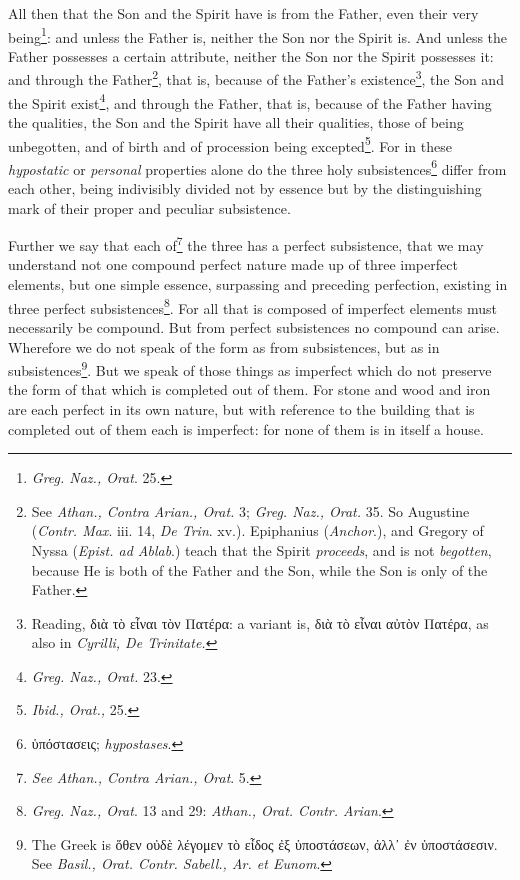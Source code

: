 All then that the Son and the Spirit have is from the Father, even their very being\footnote{\emph{Greg. Naz., Orat}. 25.}: and unless the Father is, neither the Son nor the Spirit is. And unless the Father possesses a certain attribute, neither the Son nor the Spirit possesses it: and through the Father\footnote{See \emph{Athan., Contra Arian., Orat. }3; \emph{Greg. Naz., Orat. }35. So Augustine (\emph{Contr. Max}. iii. 14, \emph{De Trin}. xv.). Epiphanius (\emph{Anchor}.), and Gregory of Nyssa (\emph{Epist. ad Ablab}.) teach that the Spirit \emph{proceeds}, and is not \emph{begotten}, because He is both of the Father and the Son, while the Son is only of the Father.}, that is, because of the Father’s existence\footnote{Reading, \textgreek{διὰ τὸ εἶναι τὸν Πατέρα}: a variant is, \textgreek{διὰ τὸ εἶναι αὐτὸν Πατέρα}, as also in \emph{Cyrilli, De Trinitate.}}, the Son and the Spirit exist\footnote{\emph{Greg. Naz., Orat. }23.}, and through the Father, that is, because of the Father having the qualities, the Son and the Spirit have all their qualities, those of being unbegotten, and of birth and of procession being excepted\footnote{\emph{Ibid., Orat.,} 25.}. For in these \emph{hypo}\emph{static} or \emph{personal }properties alone do the three holy subsistences\footnote{\textgreek{ὑπόστασεις}; \emph{hypostases}.} differ from each other, being indivisibly divided not by essence but by the distinguishing mark of their proper and peculiar subsistence.

Further we say that each of\footnote{\emph{See Athan., Contra Arian., Orat}. 5.} the three has a perfect subsistence, that we may understand not one compound perfect nature made up of three imperfect elements, but one simple essence, surpassing and preceding perfection, existing in three perfect subsistences\footnote{\emph{Greg. Naz., Orat}. 13 and 29: \emph{Athan., Orat. Contr. Arian}.}. For all that is composed of imperfect elements must necessarily be compound. But from perfect subsistences no compound can arise. Wherefore we do not speak of the form as from subsistences, but as in subsistences\footnote{The Greek is \textgreek{ὅθεν οὐδὲ λέγομεν τὸ εἶδος ἐξ ὑποστάσεων, ἀλλ᾽ ἐν ὑποστάσεσιν}. See \emph{Basil., Orat. Contr. Sabell., Ar. et Eunom}.}. But we speak of those things as imperfect which do not preserve the form of that which is completed out of them. For stone and wood and iron are each perfect in its own nature, but with reference to the building that is completed out of them each is imperfect: for none of them is in itself a house.

